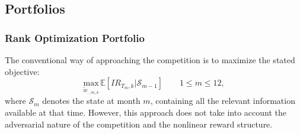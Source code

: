 \documentclass[3p,times,twocolumn]{elsarticle}
\begin{document}
\subsection{Portfolios}\label{subsection:portfolios}

\subsubsection{Rank Optimization Portfolio}

The conventional way of approaching the competition is to maximize the stated objective:
\begin{equation}\label{eq:conventional_objective}
    \underset{ \tilde{w}_{:,m,k}}{\textrm{max}}\, \mathbb{E}\left[ IR_{T_m,k} | \mathcal{S}_{m-1}\right] \qquad 1\leq m\leq 12,
\end{equation}
where $\mathcal{S}_{m}$ denotes the state at month $m$, containing all the relevant information available at that time.
However, this approach does not take into account the adversarial nature of the competition and the nonlinear reward structure.
\end{document}
